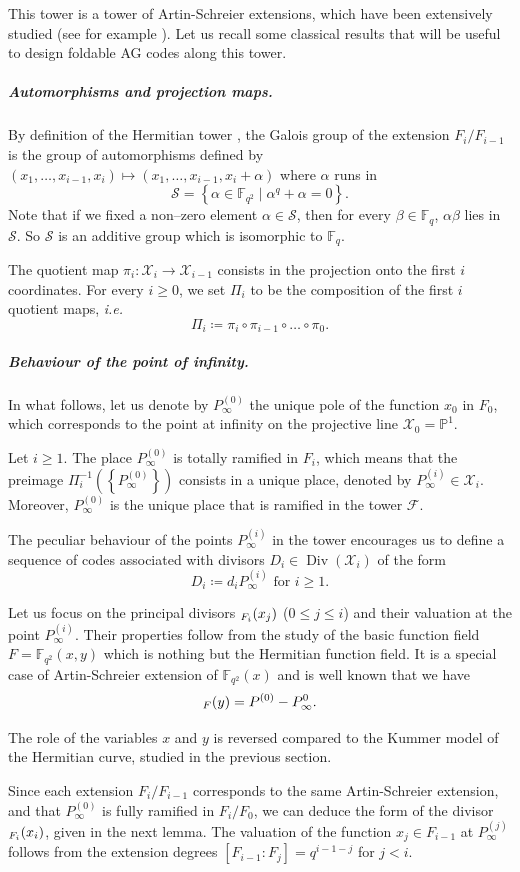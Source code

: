 \documentclass[10pt,a4paper]{article}
\newcommand\F{\mathbb{F}}
\newcommand\Fq{\mathbb{F}_q}
\newcommand\PP{\mathbb{P}}
\DeclareMathOperator{\Div}{Div}
\let\div\relax\DeclareMathOperator{\div}{div}
\newcommand{\set}[1]{\left\{#1\right\}}
\newcommand\calX{\mathcal{X}}
\newcommand\calF{\mathcal{F}}
\newcommand\mydef{\coloneqq}
\theoremstyle{plain}
\theoremstyle{plain}
\theoremstyle{definition}
\theoremstyle{remark}
\theoremstyle{plain}
\begin{document}
This tower is a tower of Artin-Schreier extensions, which have been extensively studied (see for example \cite{S08}).  Let us recall some classical results that will be useful to design foldable AG codes along this tower.

\subparagraph*{Automorphisms and projection maps.}
By definition of the Hermitian tower \cite[Proposition 3.7.10]{S08}, the Galois group of the extension $F_i/F_{i-1}$ is the group of automorphisms defined by $(x_1, \dots, x_{i-1}, x_i) \mapsto (x_1, \dots, x_{i-1}, x_i + \alpha)$ where $\alpha$ runs in 
\[\mathcal{S}  = \set{\alpha \in \F_{q^2} \mid \alpha^q + \alpha = 0}.\]
Note that if we fixed a non--zero element $\alpha \in \mathcal{S}$, then for every $\beta \in \Fq$, $\alpha \beta$ lies in $\mathcal{S}$. So $\mathcal{S}$ is an additive group which is isomorphic to $\Fq$.

The quotient map $\pi_i : \calX_i \rightarrow \calX_{i-1}$ consists in the projection onto the first $i$ coordinates. For every $i\geq 0$, we set $\Pi_i$ to be the composition of the first $i$ quotient maps, \textit{i.e.}
\[ \Pi_i \mydef \pi_i \circ \pi_{i-1}\circ \dots \circ \pi_0.\]

\subparagraph*{Behaviour of the point of infinity.}

In what follows, let us denote by $P_{\infty}^{(0)}$ the unique pole of the function $x_0$ in $F_0$, which corresponds to the point at infinity on the projective line $\calX_0=\PP^1$.

\begin{lemma}[{\cite[Proposition 3.7.8]{S08}}]
	Let $i \geq 1$. The place $P_{\infty}^{(0)}$ is totally ramified in $F_i$, which means that the preimage $\Pi_i^{-1}\left(\left\{P_{\infty}^{(0)}\right\}\right)$ consists in a unique place, denoted by $P_{\infty}^{(i)} \in \calX_i$.
	Moreover,  $P_{\infty}^{(0)}$ is the unique place that is ramified in the tower $\calF$.
\end{lemma}


The peculiar behaviour of the points $P_\infty^{(i)}$ in the tower encourages us to define a sequence of codes associated with divisors $D_i \in \Div(\calX_i)$ of the form 
\[D_i\mydef d_i P_\infty^{(i)} \text{ for }i \geq 1.\]

Let us focus on the principal divisors $\div_{F_i}(x_j)$ ($0\leq j \leq i$) and their valuation at the point $P_\infty^{(i)}$. 
Their properties follow from the study of the basic function field $F=\mathbb{F}_{q^2}(x,y)$ which is nothing but the Hermitian function field. It is a special case of Artin-Schreier extension of $\mathbb{F}_{q^2}(x)$ and is well known that we have 
\[\div_{F}(y) = P^{(0)}-P_{\infty}^0.\]
\begin{remark}
	The role of the variables $x$ and $y$ is reversed compared to the Kummer model of the Hermitian curve, studied in the previous section. 
\end{remark}
Since each extension $F_i/F_{i-1}$ corresponds to the same Artin-Schreier extension, and that $P_{\infty}^{(0)}$ is fully ramified in $F_i/F_0$, we can deduce the form of the divisor $\div_{F_i}(x_i)$, given in the next lemma. The valuation of the function $x_j \in F_{i-1}$ at $P_{\infty}^{(j)}$ follows from the extension degrees $[F_{i-1}:F_j]=q^{i-1-j}$ for $j<i$.
\end{document}
